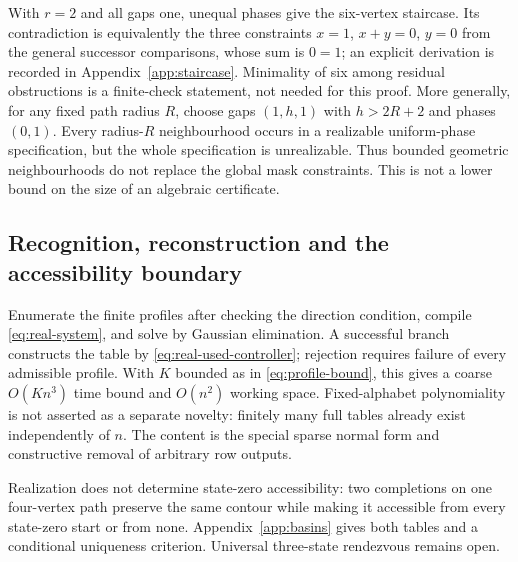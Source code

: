With $r=2$ and all gaps one, unequal phases give the six-vertex staircase.
Its contradiction is equivalently the three constraints $x=1$, $x+y=0$, $y=0$
from the general successor comparisons, whose sum is $0=1$; an explicit derivation
is recorded in Appendix~\ref{app:staircase}. Minimality of six among residual
obstructions is a finite-check statement, not needed for this proof.
More generally, for any fixed path radius $R$, choose gaps $(1,h,1)$ with
$h>2R+2$ and phases $(0,1)$. Every radius-$R$ neighbourhood occurs in a realizable
uniform-phase specification, but the whole specification is unrealizable.
Thus bounded geometric neighbourhoods do not replace the global mask constraints.
This is not a lower bound on the size of an algebraic certificate.

\subsection{Recognition, reconstruction and the accessibility boundary}

Enumerate the finite profiles after checking the direction condition, compile
\eqref{eq:real-system}, and solve by Gaussian elimination. A successful branch
constructs the table by \eqref{eq:real-used-controller}; rejection requires failure
of every admissible profile. With $K$ bounded as in \eqref{eq:profile-bound}, this
gives a coarse $O(Kn^3)$ time bound and $O(n^2)$ working space. Fixed-alphabet
polynomiality is not asserted as a separate novelty: finitely many full tables already
exist independently of $n$. The content is the special sparse normal form and
constructive removal of arbitrary row outputs.

Realization does not determine state-zero accessibility: two completions on one
four-vertex path preserve the same contour while making it accessible from every
state-zero start or from none. Appendix~\ref{app:basins} gives both tables and a
conditional uniqueness criterion. Universal three-state rendezvous remains open.
